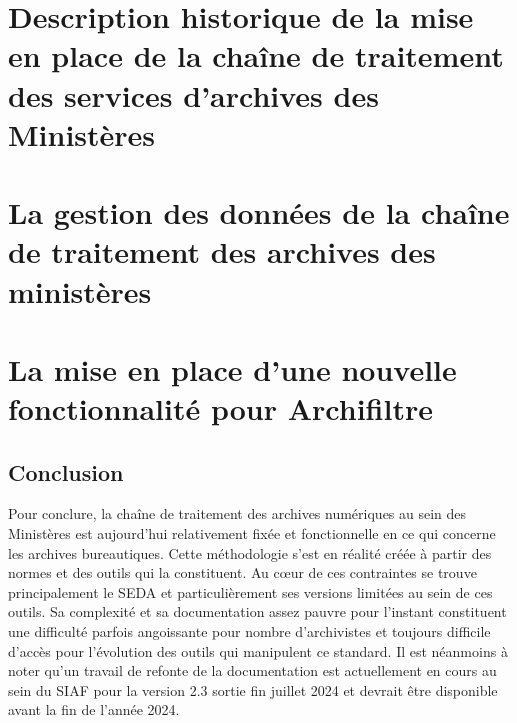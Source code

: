 \documentclass[a4paper,12pt,twoside]{book}
\begin{document}
\newpage{\pagestyle{empty}\cleardoublepage}

	\mainmatter

	

	\part{Description historique de la mise en place de la chaîne de traitement des services d’archives des Ministères}
 



	
	\part{La gestion des données de la chaîne de traitement des archives des ministères}
	
	




	\part{La mise en place d’une nouvelle fonctionnalité pour Archifiltre}
	
	








	\chapter*{Conclusion}
	
	Pour conclure, la chaîne de traitement des archives numériques au sein des Ministères est aujourd’hui relativement fixée et fonctionnelle en ce qui concerne les archives bureautiques. Cette méthodologie s’est en réalité créée à partir des normes et des outils qui la constituent. Au cœur de ces contraintes se trouve principalement le \gls{SEDA} et particulièrement ses versions limitées au sein de ces outils. Sa complexité et sa documentation assez pauvre pour l’instant constituent une difficulté parfois angoissante pour nombre d’archivistes et toujours difficile d’accès pour l’évolution des outils qui manipulent ce standard. Il est néanmoins à noter qu’un travail de refonte de la documentation est actuellement en cours au sein du SIAF pour la version 2.3 sortie fin juillet 2024 et devrait être disponible avant la fin de l’année 2024. 
	
\end{document}
